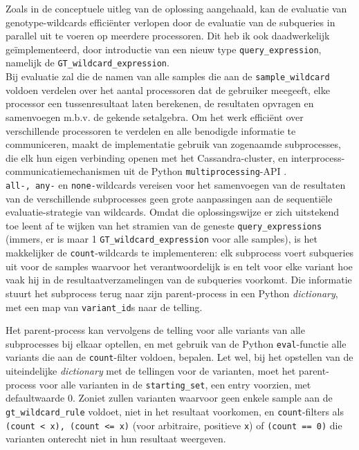 Zoals in de conceptuele uitleg van de oplossing aangehaald, kan de evaluatie van genotype-wildcards effici\"enter verlopen door de evaluatie van de subqueries in parallel uit te voeren op meerdere processoren. Dit heb ik ook daadwerkelijk ge\"implementeerd, door introductie van een nieuw type \texttt{query\_expression}, namelijk de \texttt{GT\_wildcard\_expression}.\\
Bij evaluatie zal die de namen van alle samples die aan de \texttt{sample\_wildcard} voldoen verdelen over het aantal processoren dat de gebruiker meegeeft, elke processor een tussenresultaat laten berekenen, de resultaten opvragen en samenvoegen m.b.v. de gekende setalgebra. Om het werk effici\"ent over verschillende processoren te verdelen en alle benodigde informatie te communiceren, maakt de implementatie gebruik van zogenaamde subprocesses, die elk hun eigen verbinding openen met het Cassandra-cluster, en interprocess-communicatiemechanismen uit de Python \texttt{multiprocessing}-API \cite{multiprocessing}.\\



\texttt{all-, any-} en \texttt{none-}wildcards vereisen voor het samenvoegen van de resultaten van de verschillende subprocesses geen grote aanpassingen aan de sequenti\"ele evaluatie-strategie van wildcards. Omdat die oplossingswijze er zich uitstekend toe leent af te wijken van het stramien van de geneste \texttt{query\_expressions} (immers, er is maar 1 \texttt{GT\_wildcard\_expression} voor alle samples), is het makkelijker de \texttt{count}-wildcards te implementeren: elk subprocess voert subqueries uit voor de samples waarvoor het verantwoordelijk is en telt voor elke variant hoe vaak hij in de resultaatverzamelingen van de subqueries voorkomt. Die informatie stuurt het subprocess terug naar zijn parent-process in een Python \textit{dictionary}, met een map van \texttt{variant\_id}s naar de telling.



Het parent-process kan vervolgens de telling voor alle variants van alle subprocesses bij elkaar optellen, en met gebruik van de Python \texttt{eval}-functie alle variants die aan de \texttt{count}-filter voldoen, bepalen. Let wel, bij het opstellen van de uiteindelijke \textit{dictionary} met de tellingen voor de varianten, moet het parent-process voor alle varianten in de \texttt{starting\_set}, een entry voorzien, met defaultwaarde 0. Zoniet zullen varianten waarvoor geen enkele sample aan de \texttt{gt\_wildcard\_rule} voldoet, niet in het resultaat voorkomen, en \texttt{count}-filters als \texttt{(count < x), (count <= x)} (voor arbitraire, positieve \texttt{x}) of \texttt{(count == 0)}  die varianten onterecht niet in hun resultaat weergeven.

